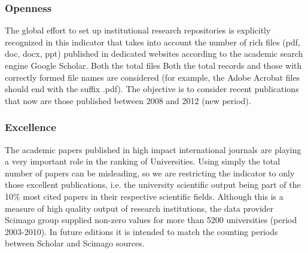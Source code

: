 \subsubsection{Openness}
The global effort to set up institutional research repositories is explicitly recognized in this indicator that takes into account the number of rich files (pdf, doc, docx, ppt) published in dedicated websites according to the academic search engine Google Scholar. Both the total files Both the total records and those with correctly formed file names are considered (for example, the Adobe Acrobat files should end with the suffix .pdf). The objective is to consider recent publications that now are those published between 2008 and 2012 (new period).

\subsubsection{Excellence}
The academic papers published in high impact international journals are playing a very important role in the ranking of Universities. Using simply the total number of papers can be misleading, so we are restricting the indicator to only those excellent publications, i.e. the university scientific output being part of the 10\% most cited papers in their respective scientific fields. Although this is a measure of high quality output of research institutions, the data provider Scimago group supplied non-zero values for more than 5200 universities (period 2003-2010). In future editions it is intended to match the counting periods between Scholar and Scimago sources.

